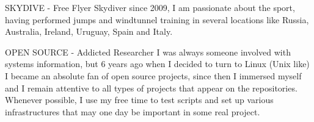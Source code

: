 \newpage
{}

\cvmetaevent
{SKYDIVE - Free Flyer}
{}
{}
{Skydiver since 2009, I am passionate about the sport, having performed jumps and windtunnel training in several locations like Russia, Australia, Ireland, Uruguay, Spain and Italy.}

\cvmetaevent
{OPEN SOURCE - Addicted Researcher}
{}
{}
{I was always someone involved with systems information, but 6 years ago when I decided to turn to Linux (Unix like) I became an absolute fan of open source projects, since then I immersed myself and I remain attentive to all types of projects that appear on the repositories. Whenever possible, I use my free time to test scripts and set up various infrastructures that may one day be important in some real project.}


\vfill